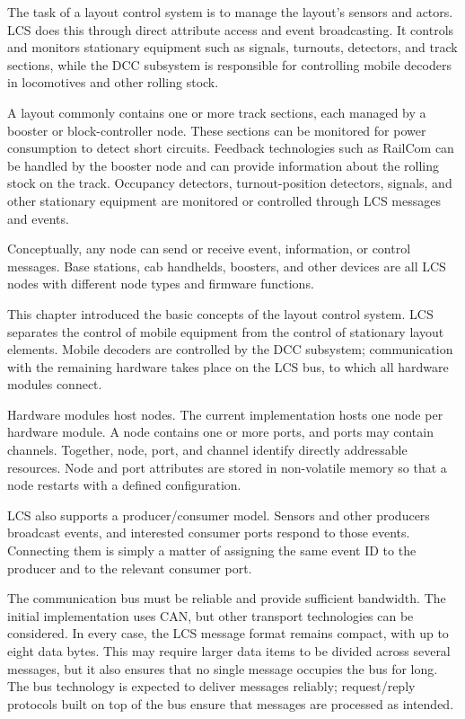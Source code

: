 
The task of a layout control system is to manage the layout's sensors and actors. LCS does this through direct attribute access and event broadcasting. It controls and monitors stationary equipment such as signals, turnouts, detectors, and track sections, while the DCC subsystem is responsible for controlling mobile decoders in locomotives and other rolling stock.

A layout commonly contains one or more track sections, each managed by a booster or block-controller node. These sections can be monitored for power consumption to detect short circuits. Feedback technologies such as RailCom can be handled by the booster node and can provide information about the rolling stock on the track. Occupancy detectors, turnout-position detectors, signals, and other stationary equipment are monitored or controlled through LCS messages and events.

Conceptually, any node can send or receive event, information, or control messages. Base stations, cab handhelds, boosters, and other devices are all LCS nodes with different node types and firmware functions.



This chapter introduced the basic concepts of the layout control system. LCS separates the control of mobile equipment from the control of stationary layout elements. Mobile decoders are controlled by the DCC subsystem; communication with the remaining hardware takes place on the LCS bus, to which all hardware modules connect.

Hardware modules host nodes. The current implementation hosts one node per hardware module. A node contains one or more ports, and ports may contain channels. Together, node, port, and channel identify directly addressable resources. Node and port attributes are stored in non-volatile memory so that a node restarts with a defined configuration.

LCS also supports a producer/consumer model. Sensors and other producers broadcast events, and interested consumer ports respond to those events. Connecting them is simply a matter of assigning the same event ID to the producer and to the relevant consumer port.

The communication bus must be reliable and provide sufficient bandwidth. The initial implementation uses CAN, but other transport technologies can be considered. In every case, the LCS message format remains compact, with up to eight data bytes. This may require larger data items to be divided across several messages, but it also ensures that no single message occupies the bus for long. The bus technology is expected to deliver messages reliably; request/reply protocols built on top of the bus ensure that messages are processed as intended.

